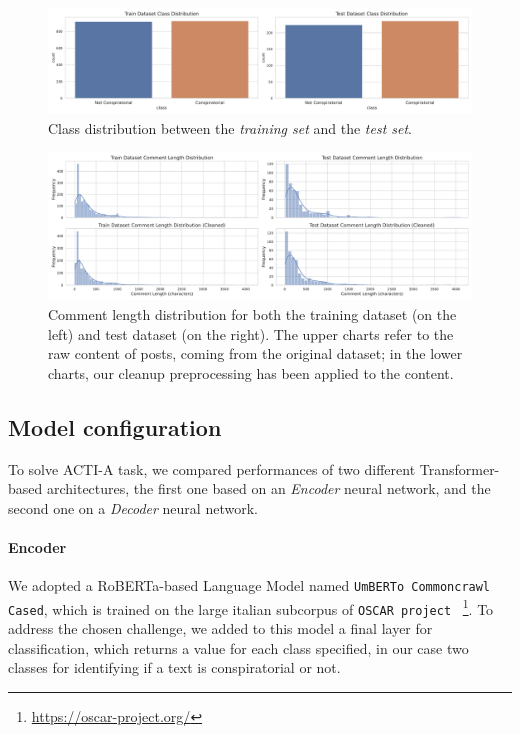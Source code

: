 \documentclass[11pt]{article}
\begin{document}
\begin{figure}
  \centering
  \includegraphics[width=\textwidth]{figures/class_distribution.pdf}
  \caption{
    Class distribution between the \emph{training set} and the \emph{test set}.
  }
  \label{fig:class-frequency}
\end{figure}

\begin{figure}
  \centering
  \includegraphics[width=\textwidth]{figures/comment_length_distribution.pdf}
  \caption{
    Comment length distribution for both the training dataset (on the left) and test dataset
    (on the right).
    The upper charts refer to the raw content of posts, coming from the original dataset;
    in the lower charts, our cleanup preprocessing has been applied to the content.
  }
  \label{fig:words-distribution}
\end{figure}

\subsection{Model configuration}\label{sec:model-config}
To solve ACTI-A task, we compared performances of two different Transformer-based architectures,
the first one based on an \emph{Encoder} neural network, and the second one on a \emph{Decoder} neural network.

\paragraph{Encoder} 

We adopted a RoBERTa-based Language Model named \texttt{UmBERTo Commoncrawl Cased}, 
which is trained on the large italian subcorpus of \texttt{OSCAR project} ~\footnote{\url{https://oscar-project.org/}}.  
%
To address the chosen challenge, we added to this model a final layer for classification,
which returns a value for each class specified, 
in our case two classes for identifying if a text is conspiratorial or not. 
\end{document}
